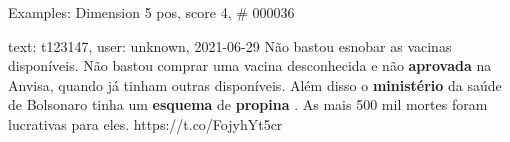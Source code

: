 \begin{frame}{Examples: Dimension 5 pos, score 4, \# 000036}
\footnotesize
\begin{exampleblock}{text: t123147, user: unknown, 2021-06-29}
Não bastou esnobar as vacinas disponíveis. Não bastou comprar uma vacina 
desconhecida e não \textbf{aprovada} na Anvisa, quando já tinham outras 
disponíveis. Além disso o \textbf{ministério} da saúde de Bolsonaro tinha um 
\textbf{esquema} de \textbf{propina} . As mais 500 mil mortes foram lucrativas 
para eles. https://t.co/FojyhYt5cr 
\end{exampleblock}
\end{frame}
